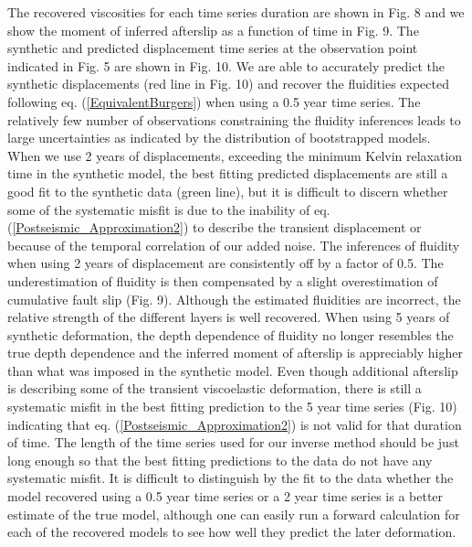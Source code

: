 \documentclass[extra,mreferee]{gji}
\begin{document}
The recovered viscosities for each time series duration are shown in
Fig. 8 and we show the moment of inferred afterslip as a function of
time in Fig. 9. The synthetic and predicted displacement time series
at the observation point indicated in Fig. 5 are shown in Fig. 10.  We
are able to accurately predict the synthetic displacements (red line
in Fig. 10) and recover the fluidities expected following
eq. (\ref{EquivalentBurgers}) when using a 0.5 year time series. The
relatively few number of observations constraining the fluidity
inferences leads to large uncertainties as indicated by the
distribution of bootstrapped models.  When we use 2 years of
displacements, exceeding the minimum Kelvin relaxation time in the
synthetic model, the best fitting predicted displacements are still a
good fit to the synthetic data (green line), but it is difficult to
discern whether some of the systematic misfit is due to the inability
of eq. (\ref{Postseismic_Approximation2}) to describe the transient
displacement or because of the temporal correlation of our added
noise.  The inferences of fluidity when using 2 years of displacement
are consistently off by a factor of 0.5.  The underestimation of
fluidity is then compensated by a slight overestimation of cumulative
fault slip (Fig. 9). Although the estimated fluidities are incorrect,
the relative strength of the different layers is well recovered.  When
using 5 years of synthetic deformation, the depth dependence of
fluidity no longer resembles the true depth dependence and the
inferred moment of afterslip is appreciably higher than what was
imposed in the synthetic model. Even though additional afterslip is
describing some of the transient viscoelastic deformation, there is
still a systematic misfit in the best fitting prediction to the 5 year
time series (Fig. 10) indicating that
eq. (\ref{Postseismic_Approximation2}) is not valid for that duration
of time.  The length of the time series used for our inverse method
should be just long enough so that the best fitting predictions to the
data do not have any systematic misfit.  It is difficult to
distinguish by the fit to the data whether the model recovered using a
0.5 year time series or a 2 year time series is a better estimate of
the true model, although one can easily run a forward calculation for
each of the recovered models to see how well they predict the later
deformation.
\end{document}
